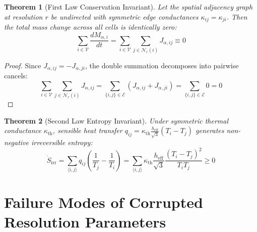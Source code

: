 \documentclass[11pt,a4paper]{article}
\newtheorem{theorem}{Theorem}
\begin{document}
\begin{theorem}[First Law Conservation Invariant]
Let the spatial adjacency graph at resolution $r$ be undirected with symmetric edge conductances $\kappa_{ij} = \kappa_{ji}$. Then the total mass change across all cells is identically zero:
\begin{equation}
\sum_{i \in \mathcal{V}} \frac{d M_{\alpha, i}}{dt} = \sum_{i \in \mathcal{V}} \sum_{j \in \mathcal{N}_r(i)} J_{\alpha, ij} \equiv 0
\end{equation}
\end{theorem}

\begin{proof}
Since $J_{\alpha, ij} = -J_{\alpha, ji}$, the double summation decomposes into pairwise cancels:
\begin{equation}
\sum_{i \in \mathcal{V}} \sum_{j \in \mathcal{N}_r(i)} J_{\alpha, ij} = \sum_{\{i, j\} \in \mathcal{E}} (J_{\alpha, ij} + J_{\alpha, ji}) = \sum_{\{i, j\} \in \mathcal{E}} 0 = 0
\end{equation}
\end{proof}

\begin{theorem}[Second Law Entropy Invariant]
Under symmetric thermal conductance $\kappa_{\text{th}}$, sensible heat transfer $q_{ij} = \kappa_{\text{th}} \frac{h_{\text{eff}}}{\sqrt{3}} (T_i - T_j)$ generates non-negative irreversible entropy:
\begin{equation}
\dot{S}_{\text{irr}} = \sum_{\langle i, j \rangle} q_{ij} \left( \frac{1}{T_j} - \frac{1}{T_i} \right) = \sum_{\langle i, j \rangle} \kappa_{\text{th}} \frac{h_{\text{eff}}}{\sqrt{3}} \frac{(T_i - T_j)^2}{T_i T_j} \ge 0
\end{equation}
\end{theorem}

\section{Failure Modes of Corrupted Resolution Parameters}
\end{document}

